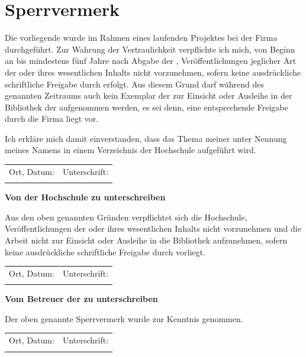 \section*{Sperrvermerk}
\thispagestyle{plain}

Die vorliegende \ArbeitTyp{} wurde im Rahmen eines laufenden Projektes bei der Firma \Firma{} durchgeführt. Zur Wahrung der Vertraulichkeit verpflichte ich mich, von Beginn an bis mindestens fünf Jahre nach Abgabe der \ArbeitTyp{}, Veröffentlichungen jeglicher Art der \ArbeitTyp{} oder ihres wesentlichen Inhalts nicht vorzunehmen, sofern keine ausdrückliche schriftliche Freigabe durch \FirmaKurz{} erfolgt. Aus diesem Grund darf während des genannten Zeitraums auch kein Exemplar der \ArbeitTyp{} zur Einsicht oder Ausleihe in der Bibliothek der \Hochschule{} aufgenommen werden, es sei denn, eine entsprechende Freigabe durch die Firma \FirmaKurz{} liegt vor.

\vspace{1em}
\noindent
Ich erkläre mich damit einverstanden, dass das Thema meiner \ArbeitTyp{} unter Nennung meines Namens in einem Verzeichnis der Hochschule aufgeführt wird.

\vspace{1em}

\begin{tabular}{p{6cm} p{6cm}}
	Ort, Datum: & Unterschrift: \\[1.5em]
	\hrulefill & \hrulefill
\end{tabular}

\vspace{2em}
\noindent
\textbf{Von der Hochschule zu unterschreiben}

\vspace{1em}
\noindent
Aus den oben genannten Gründen verpflichtet sich die Hochschule, Veröffentlichungen der \ArbeitTyp{} oder ihres wesentlichen Inhalts nicht vorzunehmen und die Arbeit nicht zur Einsicht oder Ausleihe in die Bibliothek aufzunehmen, sofern keine ausdrückliche schriftliche Freigabe durch \FirmaKurz{} vorliegt.

\vspace{1em}

\begin{tabular}{p{6cm} p{6cm}}
	Ort, Datum: & Unterschrift: \\[1.5em]
	\hrulefill & \hrulefill
\end{tabular}

\vspace{2em}
\noindent
\textbf{Vom Betreuer der \FirmaKurz{} zu unterschreiben}

\vspace{1em}
\noindent
Der oben genannte Sperrvermerk wurde zur Kenntnis genommen.

\vspace{1em}

\begin{tabular}{p{6cm} p{6cm}}
	Ort, Datum: & Unterschrift: \\[1.5em]
	\hrulefill & \hrulefill
\end{tabular}
